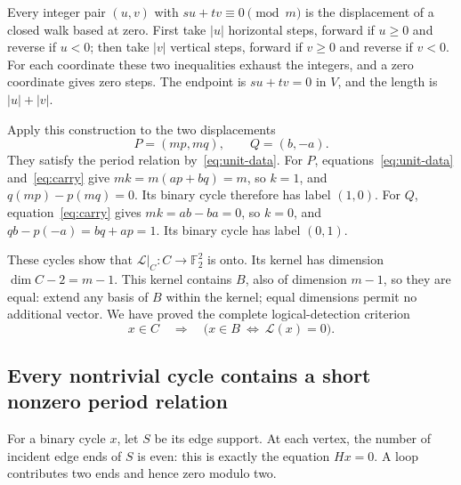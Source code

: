 \documentclass{article}
\numberwithin{equation}{section}
\begin{document}
Every integer pair \((u,v)\) with \(su+tv\equiv0\pmod m\) is the
displacement of a closed walk based at zero. First take \(\lvert u\rvert\)
horizontal steps, forward if \(u\ge0\) and reverse if \(u<0\); then take
\(\lvert v\rvert\) vertical steps, forward if \(v\ge0\) and reverse if
\(v<0\). For each coordinate these two inequalities exhaust the integers,
and a zero coordinate gives zero steps. The endpoint is \(su+tv=0\) in \(V\),
and the length is \(\lvert u\rvert+\lvert v\rvert\).

Apply this construction to the two displacements
\begin{equation}\label{eq:PQ}
  P=(mp,mq),\qquad Q=(b,-a).
\end{equation}
They satisfy the period relation by~\eqref{eq:unit-data}. For \(P\),
equations~\eqref{eq:unit-data} and~\eqref{eq:carry}
give \(mk=m(ap+bq)=m\), so \(k=1\), and
\(q(mp)-p(mq)=0\). Its binary cycle therefore has label \((1,0)\).
For \(Q\), equation~\eqref{eq:carry} gives \(mk=ab-ba=0\), so \(k=0\), and
\(qb-p(-a)=bq+ap=1\). Its binary cycle has label \((0,1)\).

These cycles show that \(\mathcal{L}|_C:C\to\mathbb F_2^2\) is onto. Its kernel has
dimension \(\dim C-2=m-1\). This kernel contains \(B\), also of dimension
\(m-1\), so they are equal: extend any basis of \(B\) within the kernel;
equal dimensions permit no additional vector. We have proved the complete
logical-detection criterion
\begin{equation}\label{eq:detect}
  x\in C\quad\Longrightarrow\quad
  \bigl(x\in B\ \Longleftrightarrow\ \mathcal{L}(x)=0\bigr).
\end{equation}

\subsection[Every nontrivial cycle contains a short nonzero period relation]%
  {Every nontrivial cycle contains a short\\ nonzero period relation}\label{sec:I-lower}

For a binary cycle \(x\), let \(S\) be its edge support. At each vertex, the
number of incident edge ends of \(S\) is even: this is exactly the equation
\(Hx=0\). A loop contributes two ends and hence zero modulo two.
\end{document}
